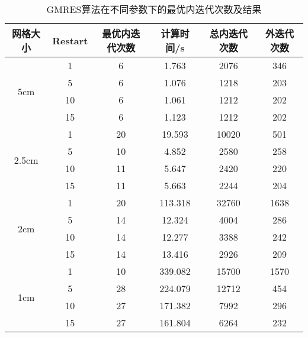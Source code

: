 \begin{table}
\centering
\caption{\label{tab:equsolve.iter.gmres}GMRES算法在不同参数下的最优内迭代次数及结果}
\begin{tabular}{cccccc}
\toprule
网格大小 & Restart & 最优内迭代次数 & 计算时间/s & 总内迭代次数 & 外迭代次数\\
\midrule
\multirow{4}{*}{5cm}
 & 1 & 6 & 1.763 & 2076 & 346\\
 & 5 & 6 & 1.076 & 1218 & 203\\
 & 10 & 6 & 1.061 & 1212 & 202\\
 & 15 & 6 & 1.123 & 1212 & 202\\
\multirow{4}{*}{2.5cm}
 & 1 & 20 & 19.593 & 10020 & 501\\
 & 5 & 10 & 4.852 & 2580 & 258\\
 & 10 & 11 & 5.647 & 2420 & 220\\
 & 15 & 11 & 5.663 & 2244 & 204\\
\multirow{4}{*}{2cm}
 & 1 & 20 & 113.318 & 32760 & 1638\\
 & 5 & 14 & 12.324 & 4004 & 286\\
 & 10 & 14 & 12.277 & 3388 & 242\\
 & 15 & 14 & 13.416 & 2926 & 209\\
\multirow{4}{*}{1cm}
 & 1 & 10 & 339.082 & 15700 & 1570\\
 & 5 & 28 & 224.079 & 12712 & 454\\
 & 10 & 27 & 171.382 & 7992 & 296\\
 & 15 & 27 & 161.804 & 6264 & 232\\
\bottomrule
\end{tabular}
\end{table}

